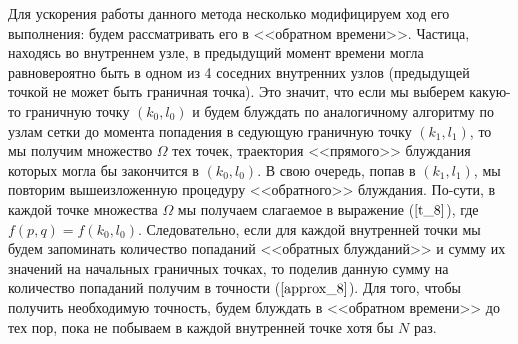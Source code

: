 \documentclass[oneside, final, 12pt]{article}
\begin{document}
	Для ускорения работы данного метода несколько модифицируем ход его выполнения: 	
	будем рассматривать его в <<обратном времени>>. Частица, находясь во внутреннем узле, 
	в предыдущий момент времени могла равновероятно быть в одном из 4 соседних внутренних узлов
	(предыдущей точкой не может быть граничная точка). Это значит, что если мы выберем
	какую-то граничную точку $(k_0,l_0)$ и будем блуждать по аналогичному 
	алгоритму по узлам сетки до момента попадения в седующую граничную точку $(k_1,l_1)$, 
	то мы получим множество $\Omega$ тех точек, траектория <<прямого>> блуждания 
	которых могла бы закончится в $(k_0,l_0)$. В свою очередь, попав в $(k_1,l_1)$, мы повторим
	вышеизложенную процедуру <<обратного>> блуждания. По-сути, в каждой точке множества $\Omega$ мы 
	получаем слагаемое в выражение ($\ref{t_8}$), где $f(p,q)=f(k_0,l_0).$ Следовательно, если для каждой
	внутренней точки мы будем запоминать количество попаданий <<обратных блужданий>> и сумму их 
	значений на начальных граничных точках, то поделив данную сумму на количество попаданий получим 
	в точности ($\ref{approx_8}$). Для того, чтобы получить необходимую точность, будем блуждать в 
	<<обратном времени>> до тех пор, пока не побываем в каждой внутренней точке хотя бы $N$ раз.
	\newline
	
\end{document}
